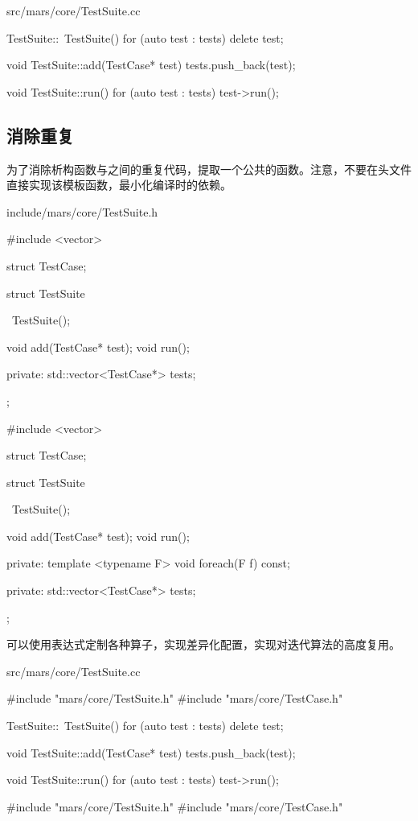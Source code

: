 \begin{content}
\begin{diff}{src/mars/core/TestSuite.cc}
\begin{minicpp}
TestSuite::~TestSuite() {
  for (auto test : tests) {
    delete test;
  }
}

void TestSuite::add(TestCase* test) {
  tests.push_back(test);
}

void TestSuite::run() {
  for (auto test : tests) {
    test->run();
  }
}
 \end{minicpp}
\end{diff}

\subsection{消除重复}

为了消除析构函数与之间的重复代码，提取一个公共的函数。注意，不要在头文件直接实现该模板函数，最小化编译时的依赖。

\begin{diff}{include/mars/core/TestSuite.h}
 \begin{minicpp}
#include <vector>

struct TestCase;

struct TestSuite {
  ~TestSuite();

  void add(TestCase* test);
  void run();

private:
  std::vector<TestCase*> tests;
};
 \end{minicpp}
\tcblower
 \begin{minicpp}
#include <vector>

struct TestCase;

struct TestSuite {
  ~TestSuite();

  void add(TestCase* test);
  void run();

private:
  template <typename F>
  void foreach(F f) const;

private:
  std::vector<TestCase*> tests;
};
 \end{minicpp}
\end{diff}

可以使用表达式定制各种算子，实现差异化配置，实现对迭代算法的高度复用。

\begin{diff}{src/mars/core/TestSuite.cc}
 \begin{minicpp}
#include "mars/core/TestSuite.h"
#include "mars/core/TestCase.h"

TestSuite::~TestSuite() {
  for (auto test : tests) {
    delete test;
  }
}

void TestSuite::add(TestCase* test) {
  tests.push_back(test);
}

void TestSuite::run() {
  for (auto test : tests) {
    test->run();
  }
}
 \end{minicpp}
\tcblower
 \begin{minicpp}
#include "mars/core/TestSuite.h"
#include "mars/core/TestCase.h"


\end{minicpp}
\end{diff}
\end{content}
